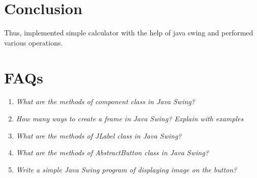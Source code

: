 \documentclass[11pt]{article}
\begin{document}
\section{Conclusion}
Thus, implemented simple calculator with the help of java swing and performed various
operations.

\pagebreak

\section{FAQs}
\begin{enumerate}
	\item \textit{What are the methods of component class in Java Swing?}

	\item \textit{How many ways to create a frame in Java Swing? Explain with examples}

	\item \textit{What are the methods of JLabel class in Java Swing?}

	\item \textit{What are the methods of AbstractButton class in Java Swing?}

	\item \textit{Write a simple Java Swing program of displaying image on the button?}

\end{enumerate}
\end{document}
